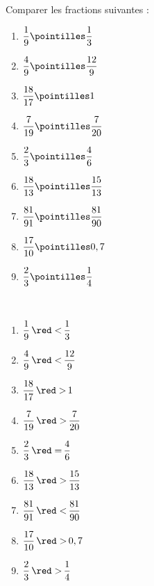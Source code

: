 \begin{exercice*}
   Comparer les fractions suivantes : \medskip
   \begin{multicols}{3}
      \begin{spacing}{2}
         \begin{enumerate}
            \item $\dfrac{1}{9} \pointilles \dfrac{1}{3}$
            \item $\dfrac{4}{9} \pointilles \dfrac{12}{9}$
            \item $\dfrac{18}{17} \pointilles 1$
            \columnbreak
            \item $\dfrac{7}{19} \pointilles \dfrac{7}{20}$
            \item $\dfrac{2}{3} \pointilles \dfrac{4}{6}$
            \item $\dfrac{18}{13} \pointilles \dfrac{15}{13}$
            \columnbreak
            \item $\dfrac{81}{91} \pointilles \dfrac{81}{90}$
            \item $\dfrac{17}{10} \pointilles 0,7$
            \item $\dfrac{2}{3} \pointilles \dfrac{1}{4}$
         \end{enumerate}                  
      \end{spacing}
   \end{multicols}
\end{exercice*}
\begin{corrige}
   \phantom{rrr}\\
   \begin{multicols}{3}
      \begin{spacing}{2}
         \begin{enumerate}
            \item $\dfrac{1}{9} \, {\red <} \, \dfrac{1}{3}$
            \item $\dfrac{4}{9} \, {\red <} \,\dfrac{12}{9}$
            \item $\dfrac{18}{17} \, {\red >} \,1$
            \columnbreak
            \item $\dfrac{7}{19} \, {\red >} \,\dfrac{7}{20}$
            \item $\dfrac{2}{3} \, {\red =} \,\dfrac{4}{6}$
            \item $\dfrac{18}{13} \, {\red >} \,\dfrac{15}{13}$
            \columnbreak
            \item $\dfrac{81}{91} \, {\red <} \,\dfrac{81}{90}$
            \item $\dfrac{17}{10} \, {\red >} \,0,7$
            \item $\dfrac{2}{3} \, {\red >} \,\dfrac{1}{4}$
         \end{enumerate}                  
      \end{spacing}
   \end{multicols}
\end{corrige}